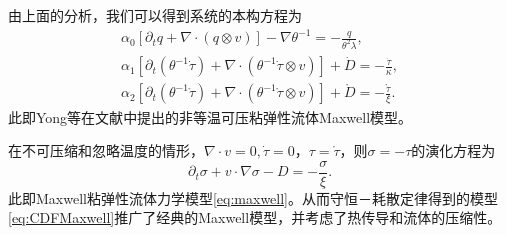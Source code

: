 	由上面的分析，我们可以得到系统的本构方程为\cite{zhu2014conservation}
	\begin{subequations}\label{eq:CDFMaxwell}
		\begin{align}
			\alpha_0 [\partial_t q +  \nabla \cdot (q \otimes v)] - \nabla \theta^{-1} = -\frac{q}{\theta^2 \lambda}, \\
			\alpha_1[\partial_t (\theta^{-1} \dot{\tau}) + \nabla \cdot (\theta^{-1} \dot{\tau} \otimes v)] + \dot{D} = -\frac{\dot{\tau}}{\kappa}, \\
			\alpha_2[\partial_t (\theta^{-1} \mathring{\tau}) + \nabla \cdot (\theta^{-1} \mathring{\tau} \otimes v)] + \mathring{D} = -\frac{\mathring{\tau}}{\xi}. 
		\end{align}
	\end{subequations}
	此即Yong等在文献\cite{zhu2014conservation}中提出的非等温可压粘弹性流体Maxwell模型。

	在不可压缩和忽略温度的情形，$\nabla \cdot v = 0, \dot{\tau}=0$，$\tau = \mathring{\tau}$，则$\sigma = -\tau$的演化方程为
	\begin{equation*}
		\partial_t \sigma + v \cdot \nabla \sigma - D = -\frac{\sigma}{\xi}. 
	\end{equation*}
	此即Maxwell粘弹性流体力学模型\eqref{eq:maxwell}。从而守恒－耗散定律得到的模型\eqref{eq:CDFMaxwell}推广了经典的Maxwell模型，并考虑了热传导和流体的压缩性。	

